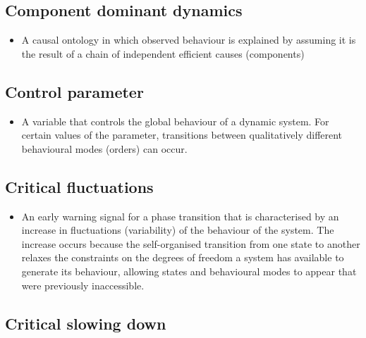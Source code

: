 \documentclass[12pt,]{book}
\providecommand{\tightlist}{%
  \setlength{\itemsep}{0pt}\setlength{\parskip}{0pt}}
\begin{document}
\hypertarget{Comp13}{%
\subsection*{\texorpdfstring{\textbf{Component dominant dynamics}}{Component dominant dynamics}}\label{Comp13}}

\begin{itemize}
\tightlist
\item
  A causal ontology in which observed behaviour is explained by assuming it is the result of a chain of independent efficient causes (components)
\end{itemize}

\hypertarget{Cont14}{%
\subsection*{\texorpdfstring{\textbf{Control parameter}}{Control parameter}}\label{Cont14}}

\begin{itemize}
\tightlist
\item
  A variable that controls the global behaviour of a dynamic system. For certain values of the parameter, transitions between qualitatively different behavioural modes (orders) can occur.
\end{itemize}

\hypertarget{Crit15}{%
\subsection*{\texorpdfstring{\textbf{Critical fluctuations}}{Critical fluctuations}}\label{Crit15}}

\begin{itemize}
\tightlist
\item
  An early warning signal for a phase transition that is characterised by an increase in fluctuations (variability) of the behaviour of the system. The increase occurs because the self-organised transition from one state to another relaxes the constraints on the degrees of freedom a system has available to generate its behaviour, allowing states and behavioural modes to appear that were previously inaccessible.
\end{itemize}

\hypertarget{Crit16}{%
\subsection*{\texorpdfstring{\textbf{Critical slowing down}}{Critical slowing down}}\label{Crit16}}
\end{document}
